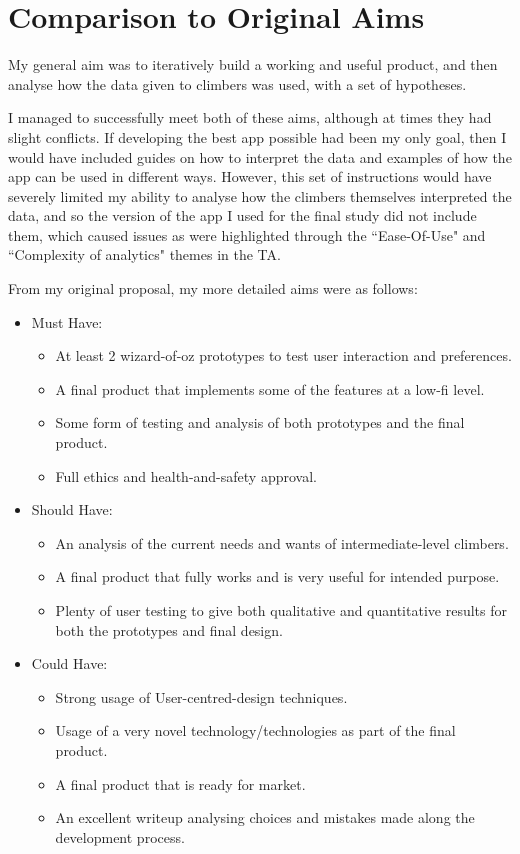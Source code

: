 \section{Comparison to Original Aims}
My general aim was to iteratively build a working and useful product, and then analyse how the data given to climbers was used, with a set of hypotheses.

I managed to successfully meet both of these aims, although at times they had slight conflicts. \label{aimsconf}
If developing the best app possible had been my only goal, then I would have included guides on how to interpret the data and examples of how the app can be used in different ways.
However, this set of instructions would have severely limited my ability to analyse how the climbers themselves interpreted the data, and so the version of the app I used for the final study did not include them, which caused issues as were highlighted through the ``Ease-Of-Use" and ``Complexity of analytics" themes in the TA.


From my original proposal, my more detailed aims were as follows:
\begin{itemize}
    \item Must Have:
    \begin{itemize}
        \item  At least 2 wizard-of-oz prototypes to test user interaction and preferences.
        \item A final product that implements some of the features at a low-fi level.
        \item  Some form of testing and analysis of both prototypes and the final product.
        \item Full ethics and health-and-safety approval.
    \end{itemize}
    
    \item Should Have:
    \begin{itemize}
        \item An analysis of the current needs and wants of intermediate-level climbers.
        \item A final product that fully works and is very useful for intended purpose.
        \item Plenty of user testing to give both qualitative and quantitative results for both the prototypes and final design.
    \end{itemize}
    
    \item Could Have: 
    \begin{itemize}
        \item Strong usage of User-centred-design techniques.
        \item Usage of a very novel technology/technologies as part of the final product.
        \item A final product that is ready for market.
        \item An excellent writeup analysing choices and mistakes made along the development process.
    \end{itemize}
\end{itemize}

